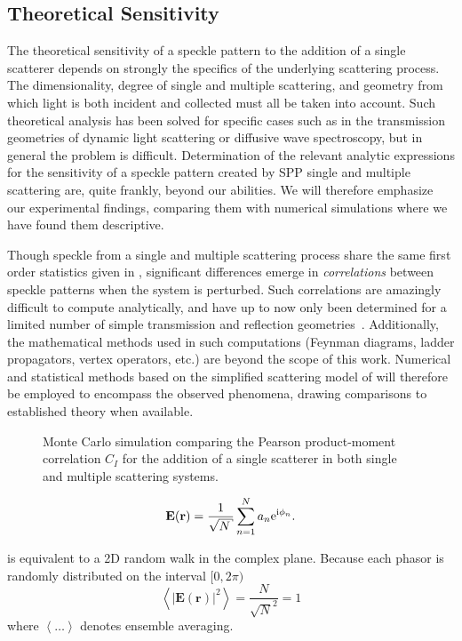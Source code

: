 \subsection{Theoretical Sensitivity}
The theoretical sensitivity of a speckle pattern to the addition of a
single scatterer depends on strongly the specifics of the underlying
scattering process.  The dimensionality, degree of single and multiple
scattering, and geometry from which light is both incident and collected
must all be taken into account.  Such theoretical analysis has been solved
for specific cases such as in the transmission geometries of dynamic light
scattering or diffusive wave spectroscopy, but in general the problem is
difficult.  Determination of the relevant analytic expressions for the
sensitivity of a speckle pattern created by SPP single and multiple
scattering are, quite frankly, beyond our abilities.  We will therefore
emphasize our experimental findings, comparing them with numerical
simulations where we have found them descriptive.

Though speckle from a single and multiple scattering process share the same
first order statistics given in , significant differences
emerge in \textit{correlations} between speckle patterns when the system is
perturbed.  Such correlations are amazingly difficult to compute analytically,
and have up to now only been determined for a limited number of simple
transmission and reflection geometries~\cite{berkovits1994correlations}.
Additionally, the mathematical methods used in such computations (Feynman
diagrams, ladder propagators, vertex operators, etc.) are beyond the scope of
this work.  Numerical and statistical methods based on the simplified
scattering model of  will therefore be employed
to encompass the observed phenomena, drawing comparisons to established theory
when available.

\begin{figure}
\centering
\caption{Monte Carlo simulation comparing the Pearson product-moment
				correlation $C_I$ for the addition of a single scatterer in both
				single and multiple scattering systems.}
\label{fig:scatteringpearson}
\end{figure}


\begin{equation}
\mathbf{E}(\mathbf{r}) = \frac{1}{\sqrt{N}} \sum_{n=1}^{N} a_n \me^{\mi \phi_n}.
\label{eqn:phasorsumdingus}
\end{equation}

 is equivalent to a 2D random walk in the
complex plane.  Because each phasor is randomly distributed on the interval
$[0,2\pi)$
\begin{equation}
\left<|\mathbf{E}(\mathbf{r})|^2\right> = \frac{N}{\sqrt{N}^2} = 1
\end{equation}
where $\left<\dots\right>$ denotes ensemble averaging.  

